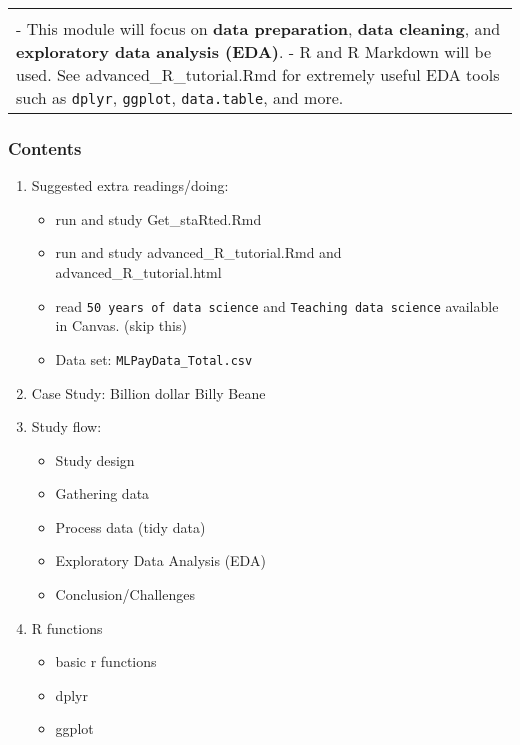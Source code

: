 \documentclass[
]{article}
\providecommand{\tightlist}{%
  \setlength{\itemsep}{0pt}\setlength{\parskip}{0pt}}
\begin{document}
\begin{longtable}[]{@{}
  >{\raggedright\arraybackslash}p{}@{}}
\toprule
\endhead
 \\
- This module will focus on \textbf{data preparation}, \textbf{data
cleaning}, and \textbf{exploratory data analysis (EDA)}. - R and R
Markdown will be used. See advanced\_R\_tutorial.Rmd for extremely
useful EDA tools such as \texttt{dplyr}, \texttt{ggplot},
\texttt{data.table}, and more. \\
\bottomrule
\end{longtable}

\frametitle{Contents}

\begin{enumerate}
\def\labelenumi{\arabic{enumi}.}
\setcounter{enumi}{-1}
\tightlist
\item
  Suggested extra readings/doing:

  \begin{itemize}
  \tightlist
  \item
    run and study Get\_staRted.Rmd
  \item
    run and study advanced\_R\_tutorial.Rmd and
    advanced\_R\_tutorial.html
  \item
    read \texttt{50\ years\ of\ data\ science} and
    \texttt{Teaching\ data\ science} available in Canvas. (skip this)
  \item
    Data set: \texttt{MLPayData\_Total.csv}
  \end{itemize}
\item
  Case Study: Billion dollar Billy Beane
\item
  Study flow:

  \begin{itemize}
  \tightlist
  \item
    Study design
  \item
    Gathering data
  \item
    Process data (tidy data)
  \item
    Exploratory Data Analysis (EDA)
  \item
    Conclusion/Challenges
  \end{itemize}
\item
  R functions

  \begin{itemize}
  \tightlist
  \item
    basic r functions
  \item
    dplyr
  \item
    ggplot
  \end{itemize}
\end{enumerate}
\end{document}
